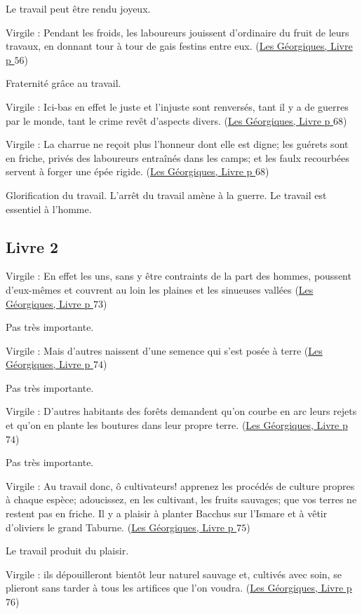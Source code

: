 \documentclass[a4paper, 11pt, hidelinks]{article}
\newcommand{\bs}{\bigskip}
\newcommand{\rb}[1]{\Romanbar{#1}}
\newcommand{\citer}[3]{\bs \begin{center} \textcolor{authorGray}{#1 :} \textcolor{citationRed}{\og #2 \fg} \textcolor{authorGray}{(\underline{#3})} \end{center} \bs}
\begin{document}
Le travail peut être rendu joyeux.


\citer{Virgile}{Pendant les froids, les laboureurs jouissent d'ordinaire du fruit de leurs travaux, en donnant tour à tour
de gais festins entre eux.}{Les Géorgiques, Livre \rb{1} p $56$}


Fraternité grâce au travail.


\citer{Virgile}{Ici-bas en effet le juste et l'injuste sont renversés, tant il y a de guerres par le monde, tant le crime
revêt d'aspects divers.}{Les Géorgiques, Livre \rb{1} p $68$}





\citer{Virgile}{La charrue ne reçoit plus l'honneur dont elle est digne; les guérets sont en friche, privés des laboureurs
entraînés dans les camps; et les faulx recourbées servent à forger une épée rigide.}{Les Géorgiques, Livre \rb{1} p $68$}


Glorification du travail. L'arrêt du travail amène à la guerre. Le travail est essentiel à l'homme.


\subsection{Livre 2}

\citer{Virgile}{En effet les uns, sans y être contraints de la part des hommes, poussent d'eux-mêmes et couvrent au loin 
les plaines et les sinueuses vallées}{Les Géorgiques, Livre \rb{2} p $73$}


Pas très importante.


\citer{Virgile}{Mais d'autres naissent d'une semence qui s'est posée à terre}{Les Géorgiques, Livre \rb{2} p $74$}


Pas très importante.


\citer{Virgile}{D'autres habitants des forêts demandent qu'on courbe en arc leurs rejets et qu'on en plante les 
boutures dans leur propre terre.}{Les Géorgiques, Livre \rb{2} p $74$}


Pas très importante.


\citer{Virgile}{Au travail donc, ô cultivateurs! apprenez les procédés de culture propres à chaque espèce; adoucissez, en les cultivant,
les fruits sauvages; que vos terres ne restent pas en friche. Il y a plaisir à planter Bacchus sur l'Ismare et à vêtir d'oliviers
le grand Taburne.}{Les Géorgiques, Livre \rb{2} p $75$}


Le travail produit du plaisir.


\citer{Virgile}{ils dépouilleront bientôt leur naturel sauvage et, cultivés avec soin, se plieront sans tarder à tous les 
artifices que l'on voudra.}{Les Géorgiques, Livre \rb{2} p $76$}
\end{document}
